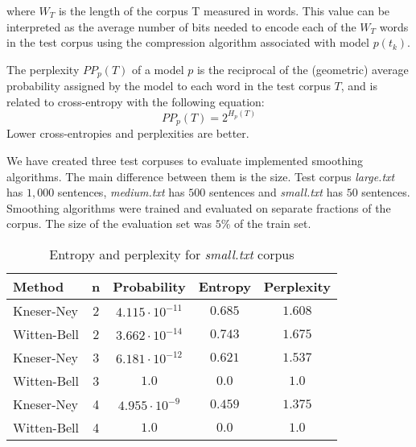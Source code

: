 \documentclass[10pt, a4paper]{article}
\begin{document}
where $W_{T}$ is the length of the corpus T measured in words. This value can be interpreted as the average number of bits needed to encode each of the $W_{T}$ words in the test corpus using the compression algorithm associated with model $p(t_{k})$.

The perplexity $PP_{p}(T)$ of a model $p$ is the reciprocal of the (geometric) average probability assigned by the model to each word in the test corpus $T$, and is related to cross-entropy with the following equation:
\begin{equation}
PP_{p} (T) = 2^{H_{p}(T)}
\end{equation}
Lower cross-entropies and perplexities are better.

We have created three test corpuses to evaluate implemented smoothing algorithms. The main difference between them is the size. Test corpus \textit{large.txt} has $1,000$ sentences, \textit{medium.txt} has $500$ sentences and \textit{small.txt} has $50$ sentences. Smoothing algorithms were trained and evaluated on separate fractions of the corpus. The size of the evaluation set was $5\%$ of the train set. 

\begin{table}[h]
\caption{Entropy and perplexity for \textit{small.txt} corpus}
\label{tab:small}
\begin{center}
\begin{tabular}{lcccc}
\toprule
Method & n & Probability & Entropy & Perplexity \\
\midrule
Kneser-Ney & 2 & $4.115 \cdot 10^{-11}$ & $0.685$ & $1.608$ \\
Witten-Bell & 2 & $3.662 \cdot 10^{-14}$ & $0.743$ & $1.675$ \\

Kneser-Ney & 3 & $6.181 \cdot 10^{-12}$ & $0.621$ & $1.537$ \\
Witten-Bell & 3 & $1.0$ & $0.0$ & $1.0$ \\

Kneser-Ney & 4 & $4.955 \cdot 10^{-9}$ & $0.459$ & $1.375$ \\
Witten-Bell & 4 & $1.0$ & $0.0$ & $1.0$ \\
\bottomrule
\end{tabular}
\end{center}
\end{table}
\end{document}

